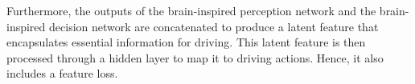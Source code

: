 Furthermore, the outputs of the brain-inspired perception network and the brain-inspired decision network are concatenated to produce a latent feature that encapsulates essential information for driving. 
This latent feature is then processed through a hidden layer to map it to driving actions. 
Hence, it also includes a feature loss.

